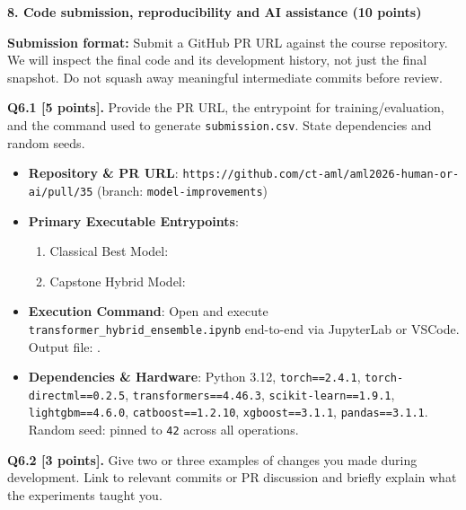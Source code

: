 \documentclass[11pt,letterpaper]{article}
\begin{document}
\vspace{12pt}
{\large\textbf{8. Code submission, reproducibility and AI assistance (10 points)}}
\vspace{2pt}

\textbf{Submission format:} Submit a GitHub PR URL against the course repository. We will inspect the final code and its development history, not just the final snapshot. Do not squash away meaningful intermediate commits before review.

\vspace{6pt}
\textbf{Q6.1 [5 points].} Provide the PR URL, the entrypoint for training/evaluation, and the command used to generate \texttt{submission.csv}. State dependencies and random seeds.

\begin{itemize}[leftmargin=*,itemsep=1pt]
    \item \textbf{Repository \& PR URL}: \texttt{https://github.com/ct-aml/aml2026-human-or-ai/pull/35} (branch: \texttt{model-improvements})
    \item \textbf{Primary Executable Entrypoints}:
    \begin{enumerate}
        \item Classical Best Model: 
        \item Capstone Hybrid Model: 
    \end{enumerate}
    \item \textbf{Execution Command}: Open and execute \texttt{transformer\_hybrid\_ensemble.ipynb} end-to-end via JupyterLab or VSCode. Output file: .
    \item \textbf{Dependencies \& Hardware}: Python 3.12, \texttt{torch==2.4.1}, \texttt{torch-directml==0.2.5}, \texttt{transformers==4.46.3}, \texttt{scikit-learn==1.9.1}, \texttt{lightgbm==4.6.0}, \texttt{catboost==1.2.10}, \texttt{xgboost==3.1.1}, \texttt{pandas==3.1.1}. Random seed: pinned to \texttt{42} across all operations.
\end{itemize}

\vspace{6pt}
\textbf{Q6.2 [3 points].} Give two or three examples of changes you made during development. Link to relevant commits or PR discussion and briefly explain what the experiments taught you.
\end{document}

